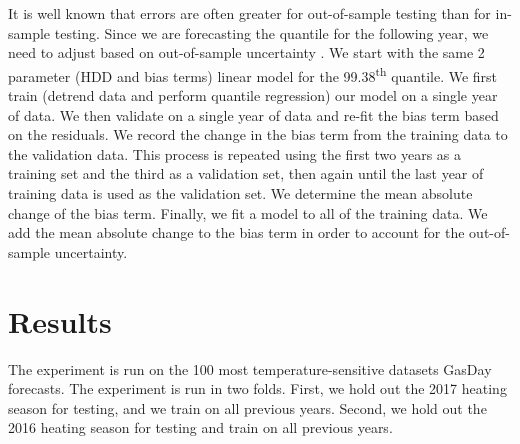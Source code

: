 \documentclass{article}
\begin{document}
It is well known that errors are often greater for out-of-sample testing than for in-sample testing. Since we are forecasting the quantile for the following year, we need to adjust based on out-of-sample uncertainty \cite{DKaftan2018}. We start with the same 2 parameter (HDD and bias terms) linear model for the 99.38\textsuperscript{th} quantile. We first train (detrend data \cite{brown2015detrending} and perform quantile regression) our model on a single year of data. We then validate on a single year of data and re-fit the bias term based on the residuals. We record the change in the bias term from the training data to the validation data. This process is repeated using the first two years as a training set and the third as a validation set, then again until the last year of training data is used as the validation set. We determine the mean absolute change of the bias term. Finally, we fit a model to all of the training data. We add the mean absolute change to the bias term in order to account for the out-of-sample uncertainty.

\section{Results}

The experiment is run on the 100 most temperature-sensitive datasets GasDay forecasts. The experiment is run in two folds. First, we hold out the 2017 heating season for testing, and we train on all previous years. Second, we hold out the 2016 heating season for testing and train on all previous years.
\end{document}
